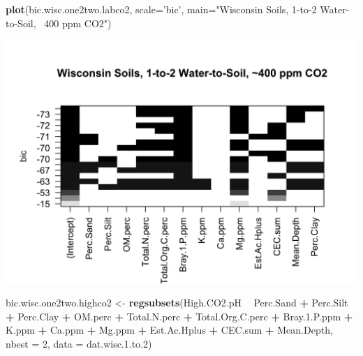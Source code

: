 \documentclass[]{article}
\newenvironment{Shaded}{\begin{snugshade}}{\end{snugshade}}
\newcommand{\DataTypeTok}[1]{\textcolor[rgb]{0.13,0.29,0.53}{#1}}
\newcommand{\DecValTok}[1]{\textcolor[rgb]{0.00,0.00,0.81}{#1}}
\newcommand{\FloatTok}[1]{\textcolor[rgb]{0.00,0.00,0.81}{#1}}
\newcommand{\KeywordTok}[1]{\textcolor[rgb]{0.13,0.29,0.53}{\textbf{#1}}}
\newcommand{\NormalTok}[1]{#1}
\newcommand{\OperatorTok}[1]{\textcolor[rgb]{0.81,0.36,0.00}{\textbf{#1}}}
\newcommand{\StringTok}[1]{\textcolor[rgb]{0.31,0.60,0.02}{#1}}
\begin{document}
\begin{Shaded}
\begin{Highlighting}[]
\KeywordTok{plot}\NormalTok{(bic.wisc.one2two.labco2, }\DataTypeTok{scale=}\StringTok{'bic'}\NormalTok{, }\DataTypeTok{main=}\StringTok{"Wisconsin Soils, 1-to-2 Water-to-Soil, ~400 ppm CO2"}\NormalTok{)}
\end{Highlighting}
\end{Shaded}

\includegraphics{output-rmd/bic.wisc.one2two.labco2-1.png}

\begin{Shaded}
\begin{Highlighting}[]
\NormalTok{bic.wisc.one2two.highco2 <-}\StringTok{ }\KeywordTok{regsubsets}\NormalTok{(High.CO2.pH }\OperatorTok{~}\StringTok{ }\NormalTok{Perc.Sand }\OperatorTok{+}\StringTok{ }\NormalTok{Perc.Silt }\OperatorTok{+}\StringTok{ }\NormalTok{Perc.Clay }\OperatorTok{+}\StringTok{ }\NormalTok{OM.perc }\OperatorTok{+}\StringTok{ }\NormalTok{Total.N.perc }\OperatorTok{+}\StringTok{ }\NormalTok{Total.Org.C.perc }\OperatorTok{+}\StringTok{ }\NormalTok{Bray.}\FloatTok{1.}\NormalTok{P.ppm }\OperatorTok{+}\StringTok{ }\NormalTok{K.ppm }\OperatorTok{+}\StringTok{ }\NormalTok{Ca.ppm }\OperatorTok{+}\StringTok{ }\NormalTok{Mg.ppm }\OperatorTok{+}\StringTok{ }\NormalTok{Est.Ac.Hplus }\OperatorTok{+}\StringTok{ }\NormalTok{CEC.sum }\OperatorTok{+}\StringTok{ }\NormalTok{Mean.Depth, }\DataTypeTok{nbest =} \DecValTok{2}\NormalTok{, }\DataTypeTok{data =}\NormalTok{ dat.wisc.}\FloatTok{1.}\NormalTok{to}\FloatTok{.2}\NormalTok{)}
\end{Highlighting}
\end{Shaded}
\end{document}
